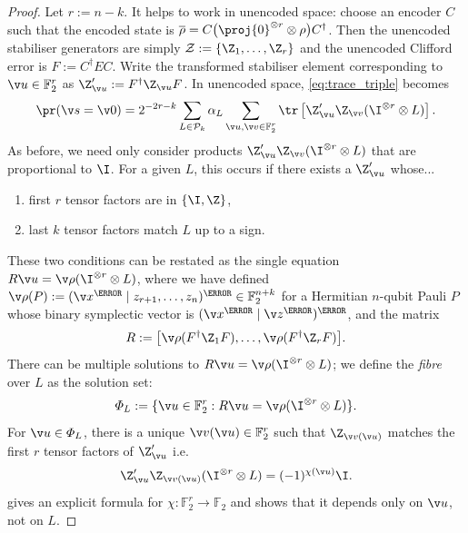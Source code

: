 \begin{proof}
Let $r :=n-k$.
It helps to work in unencoded space:
choose an encoder $C$ such that the encoded state is
$\overline{\rho} =C \big(\proj{0}^{\otimes r} \otimes \rho\big) C^\dag$.
Then the unencoded stabiliser generators are simply
$\mathcal Z:=\{\Z_1,\ldots,\Z_r\}$
and the unencoded Clifford error is $F:=C^\dag EC$.
Write the transformed stabiliser element corresponding to
$\v u\in\mathbb{F}_2^r$ as $\Z'_{\v u}:=F^\dag\Z_{\v u}F$.
In unencoded space, \cref{eq:trace_triple} becomes
\begin{equation}
\pr(\v s=\v 0)
=
2^{-2r-k}
\sum_{L\in\mathcal P_k}\alpha_L
\sum_{\v u,\v v\in\mathbb{F}_2^r}
\tr\left[\Z_{\v u}'\Z_{\v v}(\I^{\otimes r}\otimes L)\right].
\label{eq:single_conjugated_trace_expansion}
\end{equation}
As before,
we need only consider products
$\Z_{\v u}'\Z_{\v v}(\I^{\otimes r}\otimes L)$
that are proportional to $\I$.
For a given $L$,
this occurs if there exists a $\Z_{\v u}'$ whose...
\begin{enumerate}
	\item first $r$ tensor factors are in $\{\I, \Z\}$,
	\item last $k$ tensor factors match $L$ up to a sign.
\end{enumerate}
These two conditions can be restated as
the single equation
$R\v u=\v \rho(\I^{\otimes r}\otimes L)$,
where we have defined
$\v \rho(P)
:=(\v x^\T\mid z_{r+1},\ldots,z_n)^\T
\in\mathbb{F}_2^{n+k}$
for a Hermitian $n$-qubit Pauli $P$
whose binary symplectic vector is
$(\v x^\T \mid\v z^\T)^\T$,
and the matrix
\begin{equation}
R:=\big[\v \rho(F^\dag\Z_1F),\ldots,\v \rho(F^\dag\Z_rF)\big].
\label{eq:forget_check_Z_matrix}
\end{equation}
There can be multiple solutions to
$R\v u=\v \rho(\I^{\otimes r}\otimes L)$;
we define the \emph{fibre} over $L$ as the solution set:
\begin{equation}
\Phi_L:=
\{\v u\in\mathbb{F}_2^r:R\v u=\v \rho(\I^{\otimes r}\otimes L)\}.
\label{eq:fibre_defn}
\end{equation}
For $\v u\in\Phi_L$,
there is a unique $\v v(\v u)\in\mathbb{F}_2^r$ such that
$\Z_{\v v(\v u)}$ matches the first $r$ tensor factors of $\Z_{\v u}'$
i.e.
\begin{equation}
\Z'_{\v u}\Z_{\v v(\v u)}(\I^{\otimes r}\otimes L)
=(-1)^{\chi(\v u)}\I.
\label{eq:chi_defn}
\end{equation}
gives an explicit formula for $\chi: \mathbb{F}_2^r \to \mathbb{F}_2$
and shows that it depends only on $\v u$, not on $L$.


\end{proof}
